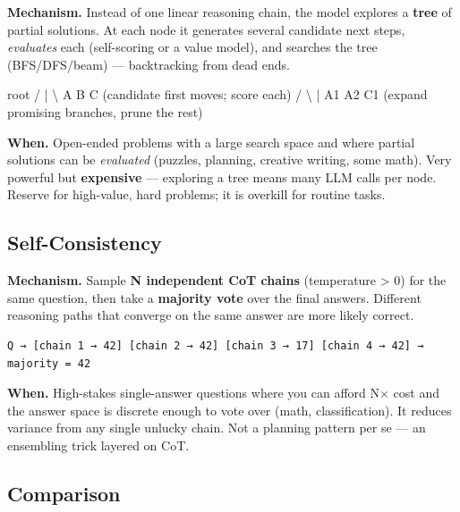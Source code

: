 \documentclass[11pt]{article}
\newenvironment{Shaded}{\begin{snugshade}}{\end{snugshade}}
\newcommand{\NormalTok}[1]{\textcolor[rgb]{0.81,0.81,0.76}{#1}}
\newcommand{\OperatorTok}[1]{\textcolor[rgb]{0.81,0.81,0.76}{#1}}
\begin{document}
\textbf{Mechanism.} Instead of one linear reasoning chain, the model explores a \textbf{tree} of partial solutions. At each node it generates several candidate next steps, \emph{evaluates} each (self-scoring or a value model), and searches the tree (BFS/DFS/beam) --- backtracking from dead ends.


\begin{Shaded}
\begin{Highlighting}[]
\NormalTok{            root}
          \OperatorTok{/}  \OperatorTok{|}  \OperatorTok{\textbackslash{}}
\NormalTok{       A    B    C       (candidate first moves}\OperatorTok{;}\NormalTok{ score each)}
      \OperatorTok{/}\NormalTok{ \textbackslash{}        }\OperatorTok{|}
\NormalTok{    A1  A2      C1        (expand promising branches, prune the rest)}
\end{Highlighting}
\end{Shaded}

\textbf{When.} Open-ended problems with a large search space and where partial solutions can be \emph{evaluated} (puzzles, planning, creative writing, some math). Very powerful but \textbf{expensive} --- exploring a tree means many LLM calls per node. Reserve for high-value, hard problems; it is overkill for routine tasks.

\subsection{Self-Consistency}\label{self-consistency}

\textbf{Mechanism.} Sample \textbf{N independent CoT chains} (temperature \textgreater{} 0) for the same question, then take a \textbf{majority vote} over the final answers. Different reasoning paths that converge on the same answer are more likely correct.

\setcodelang{}

\begin{verbatim}
Q → [chain 1 → 42] [chain 2 → 42] [chain 3 → 17] [chain 4 → 42] → majority = 42
\end{verbatim}

\textbf{When.} High-stakes single-answer questions where you can afford N\(\times\) cost and the answer space is discrete enough to vote over (math, classification). It reduces variance from any single unlucky chain. Not a planning pattern per se --- an ensembling trick layered on CoT.

\subsection{Comparison}\label{comparison}
\end{document}
